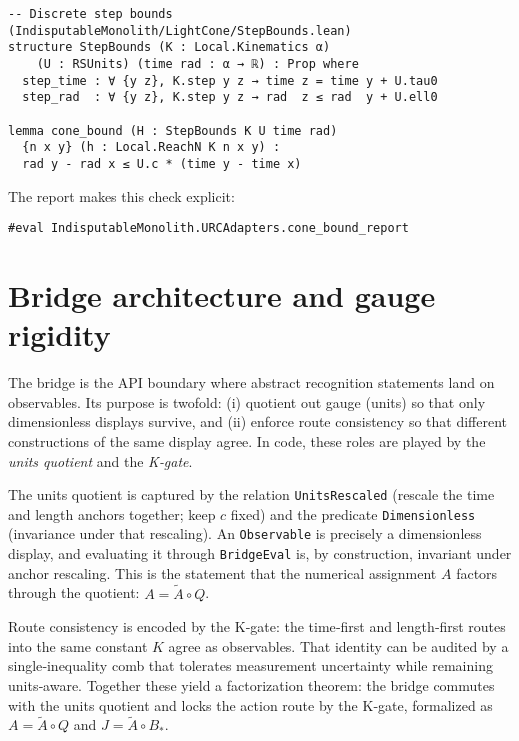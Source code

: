 \documentclass[11pt,a4paper,twoside]{article}
\numberwithin{equation}{section}
\newcommand{\Atilde}{\tilde{A}}
\newcommand{\Bstar}{B_*}
\theoremstyle{customthm}
\theoremstyle{customdef}
\theoremstyle{customrem}
\begin{document}
\begin{lstlisting}
-- Discrete step bounds (IndisputableMonolith/LightCone/StepBounds.lean)
structure StepBounds (K : Local.Kinematics α)
    (U : RSUnits) (time rad : α → ℝ) : Prop where
  step_time : ∀ {y z}, K.step y z → time z = time y + U.tau0
  step_rad  : ∀ {y z}, K.step y z → rad  z ≤ rad  y + U.ell0

lemma cone_bound (H : StepBounds K U time rad)
  {n x y} (h : Local.ReachN K n x y) :
  rad y - rad x ≤ U.c * (time y - time x)
\end{lstlisting}

The report makes this check explicit:

\begin{lstlisting}
#eval IndisputableMonolith.URCAdapters.cone_bound_report
\end{lstlisting}

\section{Bridge architecture and gauge rigidity}\label{sec:bridge}

The bridge is the API boundary where abstract recognition statements land on observables. Its purpose is twofold: (i) quotient out gauge (units) so that only dimensionless displays survive, and (ii) enforce route consistency so that different constructions of the same display agree. In code, these roles are played by the \emph{units quotient} and the \emph{K‐gate}.

The units quotient is captured by the relation \texttt{UnitsRescaled} (rescale the time and length anchors together; keep \(c\) fixed) and the predicate \texttt{Dimensionless} (invariance under that rescaling). An \texttt{Observable} is precisely a dimensionless display, and evaluating it through \texttt{BridgeEval} is, by construction, invariant under anchor rescaling. This is the statement that the numerical assignment \(A\) factors through the quotient: \(A = \Atilde \circ Q\).

Route consistency is encoded by the K‐gate: the time‐first and length‐first routes into the same constant \(K\) agree as observables. That identity can be audited by a single‐inequality comb that tolerates measurement uncertainty while remaining units‐aware. Together these yield a factorization theorem: the bridge commutes with the units quotient and locks the action route by the K‐gate, formalized as \(A = \Atilde \circ Q\) and \(J = \Atilde \circ \Bstar\).
\end{document}
